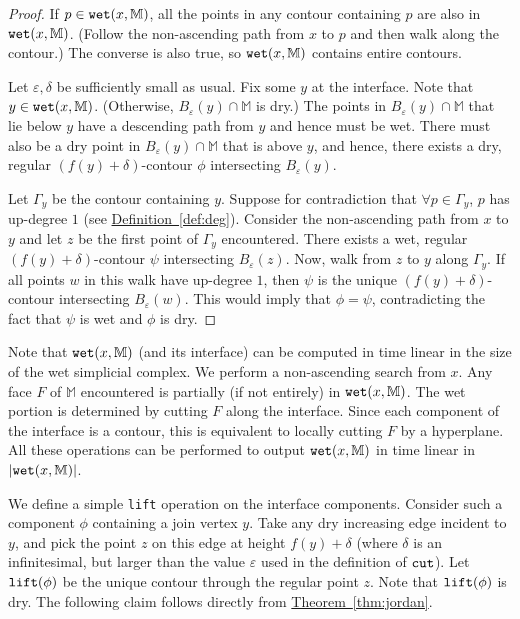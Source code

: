 \documentclass[11pt]{article}
\theoremstyle{definition}
\newcommand{\MM}{\mathbb{M}}
\newcommand{\eps}{\varepsilon}
\newcommand{\Thm}[1]{\hyperref[thm:#1]{Theorem~\ref*{thm:#1}}} %
\newcommand{\Def}[1]{\hyperref[def:#1]{Definition~\ref*{def:#1}}} %
\newcommand{\cut}{{\tt cut}}
\newcommand{\lift}{{\tt lift}}
\newcommand{\wet}{{\tt wet}}
\begin{document}
\begin{proof} If $p \in \wet(x,\MM)$, all the points in any contour containing $p$ are also in $\wet(x,\MM)$.
 (Follow the non-ascending path from $x$ to $p$ and then walk along the contour.) The converse is also true,
 so $\wet(x,\MM)$ contains entire contours.

Let $\eps, \delta$ be sufficiently small as usual. Fix some $y$ at the interface.
Note that $y \in \wet(x,\MM)$. (Otherwise, $B_\eps(y)\cap \MM$ is dry.)
The points in $B_\eps(y)\cap \MM$ that lie below $y$ have a descending path from $y$ and hence must be wet.
There must also be a dry point in $B_\eps(y)\cap \MM$ that is above $y$, and hence,
there exists a dry, regular $(f(y)+\delta)$-contour $\phi$ intersecting $B_\eps(y)$.

Let $\Gamma_y$ be the contour containing $y$.  Suppose for contradiction
that $\forall p \in \Gamma_y$, $p$ has up-degree $1$ (see \Def{deg}). Consider the non-ascending path from $x$ to $y$ and let $z$
be the first point of $\Gamma_y$ encountered. There exists a wet, regular $(f(y) + \delta)$-contour $\psi$ 
intersecting $B_\eps(z)$. Now, walk from $z$ to $y$ along $\Gamma_y$. If all points $w$ in this walk
have up-degree $1$, then $\psi$ is the unique $(f(y)+\delta)$-contour
intersecting $B_\eps(w)$. This would imply that $\phi = \psi$, contradicting the fact that $\psi$ is wet
and $\phi$ is dry.
%
\end{proof}

Note that $\wet(x,\MM)$ (and its interface) can be computed in time linear in the size of the wet simplicial complex.
We perform a non-ascending search from $x$. Any face $F$ of $\MM$ encountered is partially (if not entirely) in $\wet(x,\MM)$.
The wet portion is determined by cutting $F$ along the interface. Since each component of the interface is a contour, this is equivalent
to locally cutting $F$ by a hyperplane. All these operations can be performed to output $\wet(x,\MM)$ in time linear in $|\wet(x,\MM)|$.


We define a simple \lift{} operation on the interface components. Consider such a component $\phi$ containing
a join vertex $y$. Take any dry increasing edge incident to $y$, and pick the point $z$ on this edge at height
$f(y) + \delta$ (where $\delta$ is an infinitesimal, but larger than the value $\eps$ used in the definition of $\cut$). 
Let $\lift(\phi)$ be the unique contour through the regular point $z$. Note that $\lift(\phi)$ is dry.
The following claim follows directly from \Thm{jordan}.
\end{document}
